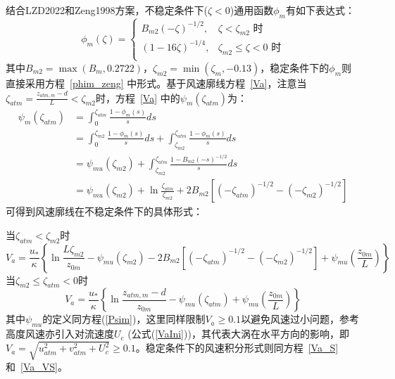 结合LZD2022和Zeng1998方案，不稳定条件下($\zeta<0$)通用函数$\phi_{m}$有如下表达式：
\begin{equation}
\phi_{m}(\zeta)= \begin{cases}
   B_{m2}(-\zeta)^{-1/2}, & \zeta<\zeta_{m2} \text { 时} \\
   (1-16 \zeta)^{-1/4}, & \zeta_{m2} \leqslant \zeta<0 \text { 时} \\
\end{cases}
\end{equation}
其中$B_{m2}=\max(B_{m},0.2722)$，$\zeta_{m2}=\min(\zeta_{m},-0.13)$，稳定条件下的$\phi_{m}$则直接采用方程~\eqref{phim_zeng} 中形式。基于风速廓线方程~\eqref{Va}，注意当
$\zeta_{atm}=\frac{z_{atm,m}-d}{L}<\zeta_{m2}$时，方程~\eqref{Va} 中的$\psi_{m}\left(\zeta_{atm}\right)$为：
\begin{align}
\psi_{m}\left(\zeta_{atm}\right) &= \int_{0}^{\zeta_{atm}} \frac{1-\phi_{m}(s)}{s} d s  \nonumber \\[1ex]
 & = \int_{0}^{\zeta_{m2}} \frac{1-\phi_{m}(s)}{s} d s + \int_{\zeta_{m2}}^{\zeta_{atm}} \frac{1-\phi_{m}(s)}{s} d s  \nonumber \\[1.5ex]
 &= \psi_{mu}(\zeta_{m2}) + \int_{\zeta_{m2}}^{\zeta_{atm}} \frac{1-B_{m2}(-s)^{-1/2}}{s} d s  \nonumber \\[1.5ex]
 & = \psi_{mu}(\zeta_{m2}) + \ln \frac{\zeta_{atm}}{\zeta_{m2}} + 2B_{m2}\left[(-\zeta_{atm})^{-1/2}-(-\zeta_{m2})^{-1/2}\right]
\end{align}
可得到风速廓线在不稳定条件下的具体形式：

\noindent 当$\zeta_{atm}<\zeta_{m2}$时
\begin{equation}\label{Va_U_LZD1}
V_{a}=\frac{u_{*}}{\kappa}\left\{\ln \frac{L\zeta_{m2}}{z_{0 m}}-\psi_{mu}\left(\zeta_{m2}\right)-2B_{m2}\left[(-\zeta_{atm})^{-1/2}-(-\zeta_{m2})^{-1/2}\right]+\psi_{mu}\left(\frac{z_{0 m}}{L}\right)\right\}
\end{equation}
\noindent 当$ \zeta_{m2} \leqslant \zeta_{atm}<0$时
\begin{equation}\label{Va_U_LZD2}
V_{a}=\frac{u_{*}}{\kappa}\left\{\ln \frac{z_{atm, m}-d}{z_{0 m}}-\psi_{mu}\left(\zeta_{atm}\right)+\psi_{mu}\left(\frac{z_{0 m}}{L}\right)\right\}
\end{equation}
其中$\psi_{mu}$的定义同方程(\ref{Psim})，这里同样限制$V_a\geq0.1$以避免风速过小问题，参考高度风速亦引入对流速度$U_c$ (公式(\ref{VaIni}))，其代表大涡在水平方向的影响，即
$V_{a}=\sqrt{u_{atm}^{2}+v_{atm}^{2}+U_{c}^{2}} \geqslant 0.1$。稳定条件下的风速积分形式则同方程~\eqref{Va_S} 和~\eqref{Va_VS}。

